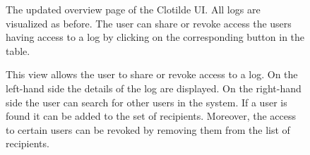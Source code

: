 \documentclass[../main.tex]{subfiles}
\begin{document}
\label{app:screenshots}
\begin{figure}[h!]
    \centering
    \caption[Clotilde UI: Overview]{
        The updated overview page of the Clotilde UI. 
        All logs are visualized as before. 
        The user can share or revoke access the users having access to a log by clicking on the corresponding button in the table.}
    \label{app:clotilde-overview}
\end{figure}
\newpage
\begin{figure}[h!]
    \centering
    \caption[Clotilde UI: Share and revoke access]{
        This view allows the user to share or revoke access to a log. 
        On the left-hand side the details of the log are displayed. 
        On the right-hand side the user can search for other users in the system. 
        If a user is found it can be added to the set of recipients. 
        Moreover, the access to certain users can be revoked by removing them from the list of recipients.}
    \label{app:clotilde-share}
\end{figure}
\end{document}
